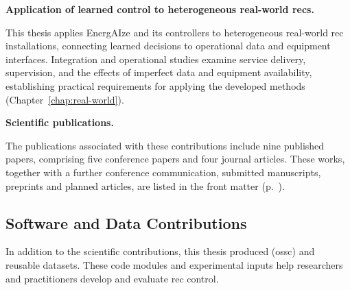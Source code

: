 \begin{description}[leftmargin=3.6em,labelwidth=3em,labelsep=0.6em,align=left,font=\normalfont\bfseries,itemsep=0.55\baselineskip,parsep=0pt,topsep=0.5\baselineskip]
\item[SC9] \textbf{Application of learned control to heterogeneous real-world \glspl{rec}.}\par\nobreak
This thesis applies EnergAIze and its controllers to heterogeneous real-world \gls{rec} installations, connecting learned decisions to operational data and equipment interfaces. Integration and operational studies examine service delivery, supervision, and the effects of imperfect data and equipment availability, establishing practical requirements for applying the developed methods (Chapter~\ref{chap:real-world}).

\item[SC10] \textbf{Scientific publications.}\par\nobreak
The publications associated with these contributions include nine published papers, comprising five conference papers and four journal articles. These works, together with a further conference communication, submitted manuscripts, preprints and planned articles, are listed in the front matter (p.~\pageref{sec:thesis-publications}).
\end{description}

\subsection{Software and Data Contributions}
\label{sec:intro-software-contributions}

In addition to the scientific contributions, this thesis produced  (\acrshort{ossc}) and reusable datasets. These code modules and experimental inputs help researchers and practitioners develop and evaluate \gls{rec} control.

